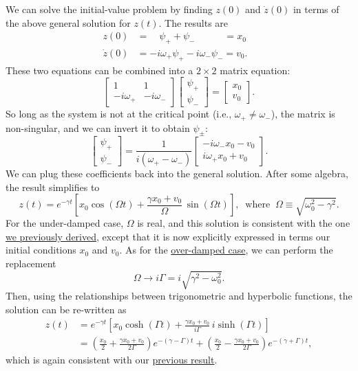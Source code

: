 \documentclass[10pt,a4paper]{article}
\begin{document}
We can solve the initial-value problem by finding $z(0)$ and
$\dot{z}(0)$ in terms of the above general solution for $z(t)$. The
results are
\begin{align}
  z(0) &= \quad \psi_+ + \psi_- \qquad\quad = x_0& \\
  \dot{z}(0) &= -i\omega_+ \psi_+ - i \omega_- \psi_- = v_0.&
\end{align}
These two equations can be combined into a $2\times2$ matrix equation:
\begin{equation}
  \begin{bmatrix}1 & 1 \\ -i\omega_+ & -i\omega_-\end{bmatrix} \begin{bmatrix}\psi_+ \\ \psi_-\end{bmatrix} = \begin{bmatrix}x_0 \\ v_0\end{bmatrix}.
\end{equation}
So long as the system is not at the critical point (i.e., $\omega_+
\ne \omega_-$), the matrix is non-singular, and we can invert it to
obtain $\psi_\pm$:
\begin{equation}
  \begin{bmatrix}\psi_+ \\ \psi_-\end{bmatrix} = \frac{1}{i(\omega_+-\omega_-)}\begin{bmatrix}-i\omega_-x_0 - v_0 \\ i\omega_+x_0 + v_0 \end{bmatrix}.
\end{equation}
We can plug these coefficients back into the general solution. After
some algebra, the result simplifies to
\begin{equation}
  z(t) = e^{-\gamma t} \left[x_0 \cos(\Omega t) + \frac{\gamma x_0 + v_0}{\Omega} \, \sin(\Omega t)\right], \;\; \mathrm{where}\;\; \Omega \equiv \sqrt{\omega_0^2 - \gamma^2}.
\end{equation}
For the under-damped case, $\Omega$ is real, and this solution is
consistent with the one \hyperref[under-damped-motion]{we previously
  derived}, except that it is now explicitly expressed in terms our
initial conditions $x_0$ and $v_0$. As for the
\hyperref[over-damped-motion]{over-damped case}, we can perform the
replacement
\begin{equation}
  \Omega \rightarrow i \Gamma = i \sqrt{\gamma^2 - \omega_0^2}.
\end{equation}
Then, using the relationships between trigonometric and hyperbolic
functions, the solution can be re-written as
\begin{align}
  z(t) &= e^{-\gamma t} \left[x_0 \cosh(\Gamma t) + \frac{\gamma x_0 + v_0}{i\Gamma} \, i \sinh(\Gamma t)\right] \\
  &= \left(\frac{x_0}{2} + \frac{\gamma x_0 + v_0}{2\Gamma}\right) e^{-(\gamma - \Gamma) t} + \left(\frac{x_0}{2} - \frac{\gamma x_0 + v_0}{2\Gamma}\right) e^{-(\gamma+\Gamma)t},
\end{align}
which is again consistent with our
\hyperref[over-damped-motion]{previous result}.
\end{document}
